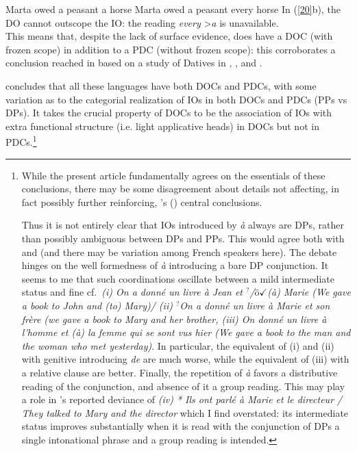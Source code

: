 \documentclass[output=paper]{langsci/langscibook}
\begin{document}
\ea \label{20}
    \ea Marta owed a peasant a horse
    \ex Marta owed a peasant every horse
    \z
\z
%
In (\ref{20}b), the DO cannot outscope the IO: the reading {\it every}
\textgreater {\it a} is unavailable.\\ This means that, despite the lack of
surface evidence,   does have a \gls{DOC}
(with frozen scope) in addition to a \gls{PDC} (without frozen scope): this corroborates a conclusion  reached
in \cite{anagnostopoulou2005cross} based on a study of Datives in ,
,  and .\largerpage[-4]

\cite{anagnostopoulou2005cross} concludes that all these  languages have both
\glspl{DOC} and \glspl{PDC}, with some variation as to the categorial
realization of \glspl{IO} in both \glspl{DOC} and \glspl{PDC} (PPs vs DPs).  It
takes the crucial  property of \glspl{DOC} to be  the association of \glspl{IO}
with extra functional structure (i.e. light applicative heads) in \glspl{DOC}
but not in \glspl{PDC}.\footnote{While the present article fundamentally agrees
    on the essentials of these conclusions, there may be some disagreement
    about details not affecting, in fact possibly further reinforcing,
    \citeauthor{anagnostopoulou2005cross}'s
    (\citeyear{anagnostopoulou2005cross}) central conclusions.

    Thus it is not entirely clear that \glspl{IO} introduced by \emph{à} always
    are DPs, rather than possibly ambiguous between DPs and PPs. This would
    agree both with \cite{Kayne1975} and \cite{Vergnaud:1974} (and there may be
    variation among French speakers here). The debate hinges on the well
    formedness of \emph{à} introducing a bare DP conjunction. It seems to me
    that such coordinations oscillate between a mild  intermediate status and
    fine cf.\ {\it (i) On a donn\'e un livre \`a Jean et
        $^{?}$/$ö{\checkmark}$(\`a) Marie (We gave a book to John and (to)
        Mary)/ (ii) $^{?}$On a donn\'e un livre \`a Marie et son fr\`ere (we
        gave a book to Mary and her brother, (iii) \checkmark On donn\'e un
    livre \`a l'homme et (\`a) la femme qui se sont vus hier (We gave a book to
the man and the woman who met yesterday)}. In particular, the equivalent of (i)
and (ii) with genitive introducing {\it de} are much worse, while the
equivalent of (iii) with a relative clause are better. Finally, the repetition
of \emph{à} favors a distributive reading of the conjunction, and absence of it
a group reading. This may play a role in \citeauthor{Jaeggli:1982}'s
\citeyear{Jaeggli:1982} reported deviance of {\it (iv) * Ils ont parl\'e \`a
Marie et le directeur / They talked to Mary and the director} which I find
overstated: its intermediate status improves substantially when it is read with
the conjunction of DPs a single intonational phrase and a group reading is
intended.}
\end{document}
